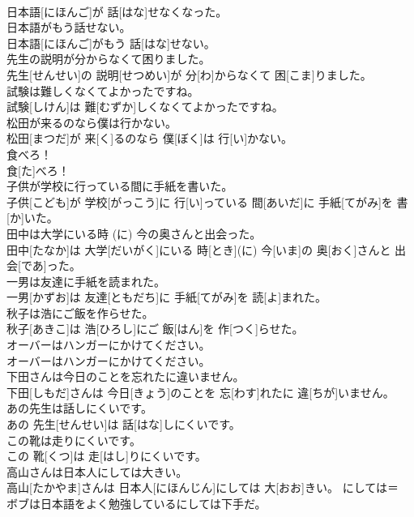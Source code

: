 \documentclass[8pt]{extreport}
\begin{document}
\begin{CJK}{UTF8}{min}
\\	日本語[にほんご]が 話[はな]せなくなった。	
\\	日本語がもう話せない。	
\\	日本語[にほんご]がもう 話[はな]せない。	
\\	先生の説明が分からなくて困りました。	
\\	先生[せんせい]の 説明[せつめい]が 分[わ]からなくて 困[こま]りました。	
\\	試験は難しくなくてよかったですね。	
\\	試験[しけん]は 難[むずか]しくなくてよかったですね。	
\\	松田が来るのなら僕は行かない。	
\\	松田[まつだ]が 来[く]るのなら 僕[ぼく]は 行[い]かない。	
\\	食べろ！	
\\	食[た]べろ！	
\\	子供が学校に行っている間に手紙を書いた。	
\\	子供[こども]が 学校[がっこう]に 行[い]っている 間[あいだ]に 手紙[てがみ]を 書[か]いた。	
\\	田中は大学にいる時 (に) 今の奥さんと出会った。	
\\	田中[たなか]は 大学[だいがく]にいる 時[とき](に) 今[いま]の 奥[おく]さんと 出会[であ]った。	
\\	一男は友達に手紙を読まれた。	
\\	一男[かずお]は 友達[ともだち]に 手紙[てがみ]を 読[よ]まれた。	
\\	秋子は浩にご飯を作らせた。	
\\	秋子[あきこ]は 浩[ひろし]にご 飯[はん]を 作[つく]らせた。	
\\	オーバーはハンガーにかけてください。	
\\	オーバーはハンガーにかけてください。	
\\	下田さんは今日のことを忘れたに違いません。	
\\	下田[しもだ]さんは 今日[きょう]のことを 忘[わす]れたに 違[ちが]いません。	
\\	あの先生は話しにくいです。	
\\	あの 先生[せんせい]は 話[はな]しにくいです。	
\\	この靴は走りにくいです。	
\\	この 靴[くつ]は 走[はし]りにくいです。	
\\	高山さんは日本人にしては大きい。	
\\	高山[たかやま]さんは 日本人[にほんじん]にしては 大[おお]きい。	にしては＝ 
\\	ボブは日本語をよく勉強しているにしては下手だ。	

\end{CJK}
\end{document}
